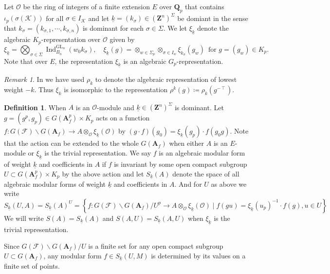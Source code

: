\documentclass[leqno]{amsart}
\theoremstyle{definition}
\newtheorem{defn}[thm]{Definition}
\theoremstyle{remark}
\newtheorem{rem}[thm]{Remark}
\newcommand{\oo}{\mathcal{O}}
\newcommand{\Z}{{\mathbf{Z}}}
\newcommand{\Qp}{\mathbf{Q}_p}
\newcommand{\A}{\mathbf A}
\DeclareMathOperator{\Ind}{Ind}
\DeclareMathOperator{\GL}{GL}
\newcommand{\F}{{\mathcal{F}}} %
\newcommand{\K}{{\mathcal{K}}} %
\newcommand{\wt}[1]{\underline{ #1 }}
\begin{document}
Let $\oo$ be the ring of integers 
of a finite extension $E$ over $\Qp$
that contains $\iota_p(\sigma(\K))$
for all $\sigma\in I_\K$
and let $\wt{k}=(k_\sigma)\in (\Z^n)^{\Sigma}$
be domiant in the sense that
$k_\sigma=(k_{\sigma,1},\cdots,k_{\sigma,n})$
is dominant for each $\sigma\in \Sigma$.
We let $\xi_{\wt{k}}$ denote 
the algebraic $K_p$-representation over $\oo$ given by
\begin{equation}\label{def:algrep}
	\xi_{\wt{k}}=\bigotimes_{\sigma\in \Sigma}
	\Ind_{B_n}^{\GL_n}(w_0k_{\sigma}),\quad
	\xi_{\wt{k}}(g)=
	\otimes_{w\in \Sigma_p}
	\otimes_{\sigma\in I_w}\xi_{k_\sigma}(g_w)\,
	\text{ for } g=(g_w)\in K_p.
\end{equation}
Note that over $E$, the representation $\xi_{\wt{k}}$ 
is an algebraic $G_p$-representation.

\begin{rem}
    In \cite{lee} we have used  $\rho_k$ to denote
	the algebraic representation of lowest weight  $-k$.
	Thus $\xi_k$ is isomorphic to the representation 
	$\rho^k(g)\coloneqq \rho_k(g^{-\intercal})$.
\end{rem}




\begin{defn}\label{def:algform}
When $A$ is an $\oo$-module and  
$\wt{k}\in (\Z^n)^{\Sigma}$ is dominant.
Let $g=(g^p,g_p)\in G(\A_f^p)\times K_p$ acts on a function
$f\colon G(\F)\backslash G(\A_f)\to A\otimes_{\oo}\xi_{\wt{k}}(\oo)$
by $(g\cdot f)(g_0)=\xi_{\wt{k}}(g_p)\cdot f(g_0g)$.
Note that the action can be extended to the whole $G(\A_f)$
when either $A$ is an $E$-module or $\xi_{\wt{k}}$
is the trivial representation.
We say $f$ is an algebraic modular form of
weight $\wt{k}$ and coefficients in $A$
if $f$ is invariant by some open compact subgroup
$U\subset G(\A_f^p)\times K_p$ by the above action
and let $S_{\wt{k}}(A)$
denote the space of all algebraic modular forms
of weight $\wt{k}$ and coefficients in $A$.
And for $U$ as above we write
\begin{equation}
S_{\wt{k}}(U,A)=
S_{\wt{k}}(A)^U=
\left\{ f: G(\F)\backslash G(\A_f)/U^p 
\rightarrow A\otimes_{\oo}\xi_{\wt{k}}(\oo)
\mid f(gu)=\xi_{\wt{k}}(u_p)^{-1}\cdot f(g), u\in U\right\} 
\end{equation}
We will write $S(A)=S_{\wt{k}}(A)$ and
$S(A,U)=S_{\wt{k}}(A,U)$
when $\xi_{\wt{k}}$ is the trivial representation.
\end{defn}


Since $G(\F)\backslash G(\A_f)/U$ is a finite set
for any open compact subgroup $U\subset G(\A_f)$,
any modular form $f\in S_{\wt{k}}(U,M)$ 
is determined by its values on a finite set of points.
\end{document}
